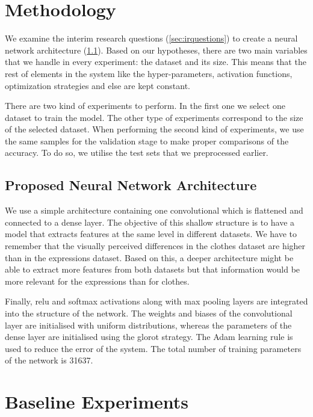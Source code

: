\documentclass{article}
\begin{document}
\section{Methodology}
\label{sec:methodology}
We examine the interim research questions (\ref{sec:irquestions}) to create a neural network architecture (\ref{sec:arch}). Based on our hypotheses, there are two main variables that we handle in every experiment: the dataset and its size. This means that the rest of elements in the system like the hyper-parameters, activation functions, optimization strategies and else are kept constant.

There are two kind of experiments to perform. In the first one we select one dataset to train the model. The other type of experiments correspond to the size of the selected dataset. When performing the second kind of experiments, we use the same samples for the validation stage to make proper comparisons of the accuracy. To do so, we utilise the test sets that we preprocessed earlier.


\subsection{Proposed Neural Network Architecture}
\label{sec:arch}

We use a simple architecture containing one convolutional which is flattened and connected to a dense layer. The objective of this shallow structure is to have a model that extracts features at the same level in different datasets. We have to remember that the visually perceived differences in the clothes dataset are higher than in the expressions dataset. Based on this, a deeper architecture might be able to extract more features from both datasets but that information would be more relevant for the expressions than for clothes.

Finally, relu and softmax activations along with max pooling layers are integrated into the structure of the network. The weights and biases of the convolutional layer are initialised with uniform distributions, whereas the parameters of the dense layer are initialised using the glorot strategy. The Adam learning rule is used to reduce the error of the system.  The total number of training parameters of the network is 31637. 


\section{Baseline Experiments}
\label{sec:baseline}
\end{document}

